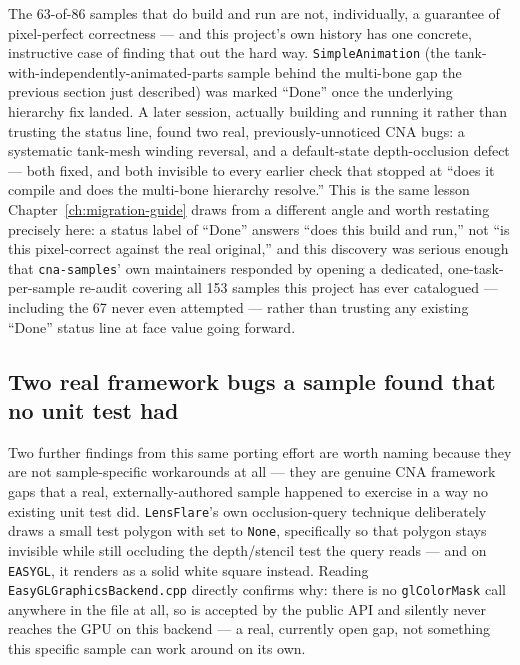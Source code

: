 The 63-of-86 samples that do build and run are not, individually, a guarantee of pixel-perfect
correctness --- and this project's own history has one concrete, instructive case of finding
that out the hard way. \texttt{SimpleAnimation} (the tank-with-independently-animated-parts
sample behind the multi-bone gap the previous section just described) was marked ``Done'' once
the underlying  hierarchy fix landed. A later session, actually building and
running it rather than trusting the status line, found two real, previously-unnoticed CNA
bugs: a systematic tank-mesh winding reversal, and a  default-state
depth-occlusion defect --- both fixed, and both invisible to every earlier check that stopped at
``does it compile and does the multi-bone hierarchy resolve.'' This is the same lesson
Chapter~\ref{ch:migration-guide} draws from a different angle and worth restating precisely
here: a status label of ``Done'' answers ``does this build and run,'' not ``is this pixel-correct
against the real original,'' and this discovery was serious enough that \texttt{cna-samples}'
own maintainers responded by opening a dedicated, one-task-per-sample re-audit covering all 153
samples this project has ever catalogued --- including the 67 never even attempted --- rather
than trusting any existing ``Done'' status line at face value going forward.

\subsection{Two real framework bugs a sample found that no unit test had}

Two further findings from this same porting effort are worth naming because they are not
sample-specific workarounds at all --- they are genuine CNA framework gaps that a real,
externally-authored sample happened to exercise in a way no existing unit test did.
\texttt{LensFlare}'s own occlusion-query technique deliberately draws a small test polygon with
 set to \texttt{None}, specifically so that polygon
stays invisible while still occluding the depth/stencil test the query reads --- and on
\texttt{EASYGL}, it renders as a solid white square instead. Reading
\texttt{EasyGLGraphicsBackend.cpp} directly confirms why: there is no \texttt{glColorMask} call
anywhere in the file at all, so  is accepted by the public API and
silently never reaches the GPU on this backend --- a real, currently open gap, not something
this specific sample can work around on its own.

